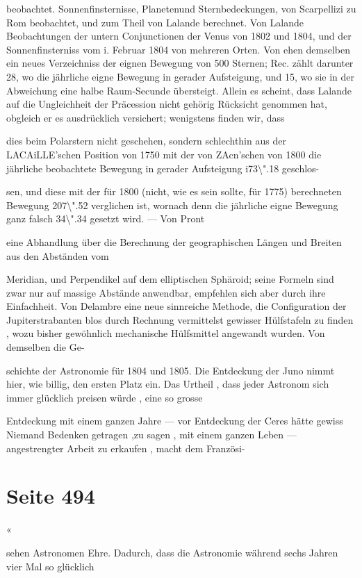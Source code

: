\documentclass[10pt,a4paper]{article}
\begin{document}
beobachtet. Sonnenfinsternisse, Planetenund Sternbedeckungen, von Scarpellizi zu Rom beobachtet, und zum Theil von Lalande berechnet. Von Lalande Beobachtungen der untern Conjunctionen der Venus von 1802 und 1804, und der Sonnenfinsterniss vom i. Februar 1804 von mehreren Orten. Von ehen demselben ein neues Verzeichniss der eignen Bewegung von 500 Sternen; Rec. zählt darunter 28, wo die jährliche eigne Bewegung in gerader Aufsteigung, und 15, wo sie in der Abweichung eine halbe Raum-Secunde übersteigt. Allein es scheint, dass Lalande auf die Ungleichheit der Präcession nicht gehörig Rücksicht genommen hat, obgleich er es ausdrücklich versichert; wenigstens finden wir, dass

dies beim Polarstern nicht geschehen, sondern schlechthin aus der LACAiLLE'schen Position von 1750 mit der von ZAcn'schen von 1800 die jährliche beobachtete Bewegung in gerader Aufsteigung i73\textbackslash{}".18 geschlos-

sen, und diese mit der für 1800 (nicht, wie es sein sollte, für 1775) berechneten Bewegung 207\textbackslash{}".52 verglichen ist, wornach denn die jährliche eigne Bewegung ganz falsch 34\textbackslash{}".34 gesetzt wird. — Von Pront

eine Abhandlung über die Berechnung der geographischen Längen und Breiten aus den Abständen vom

Meridian, und Perpendikel auf dem elliptischen Sphäroid; seine Formeln sind zwar nur auf massige Abstände anwendbar, empfehlen sich aber durch ihre Einfachheit. Von Delambre eine neue sinnreiche Methode, die Configuration der Jupiterstrabanten blos durch Rechnung vermittelst gewisser Hülfstafeln zu finden , wozu bisher gewöhnlich mechanische Hülfsmittel angewandt wurden. Von demselben die Ge-

schichte der Astronomie für 1804 und 1805. Die Entdeckung der Juno nimmt hier, wie billig, den ersten Platz ein. Das Urtheil , dass jeder Astronom sich immer glücklich preisen würde , eine so grosse

Entdeckung mit einem ganzen Jahre — vor Entdeckung der Ceres hätte gewiss Niemand Bedenken getragen ,zu sagen , mit einem ganzen Leben — angestrengter Arbeit zu erkaufen , macht dem Französi-


\newpage
\section*{Seite 494}
«

sehen Astronomen Ehre. Dadurch, dass die Astronomie während sechs Jahren vier Mal so glücklich
\end{document}
